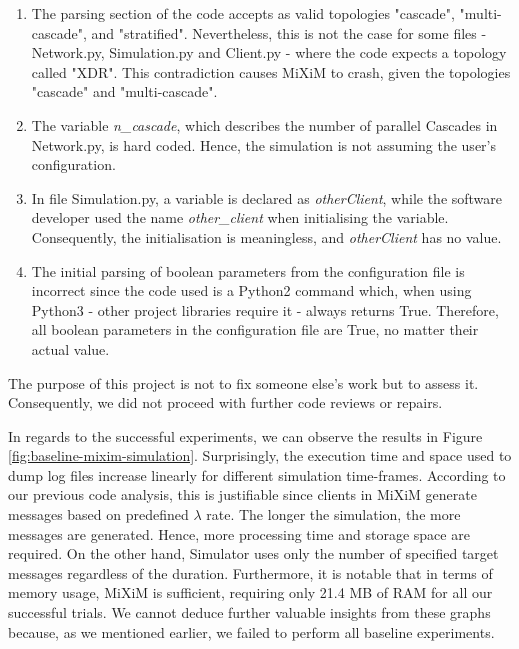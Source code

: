 \documentclass[logo,msc,cyber]{infthesis}   %
\begin{document}
\begin{enumerate}
    \item The parsing section of the code accepts as valid topologies "cascade",
    "multi-cascade", and "stratified". Nevertheless, this is not the case for
    some files - Network.py, Simulation.py and Client.py - where the code
    expects a topology called "XDR". This contradiction causes MiXiM to crash,
    given the topologies "cascade" and "multi-cascade". 
    \item The variable \emph{n\_cascade}, which describes the number of parallel
    Cascades in Network.py, is hard coded. Hence, the simulation is not assuming
    the user's configuration.
    \item In file Simulation.py, a variable is declared as \emph{otherClient}, while
    the software developer used the name \emph{other\_client} when initialising the
    variable. Consequently, the initialisation is meaningless, and \emph{otherClient}
    has no value.
    \item The initial parsing of boolean parameters from the configuration file
    is incorrect since the code used is a Python2 command which, when using
    Python3 - other project libraries require it - always returns True.
    Therefore, all boolean parameters in the configuration file are True, no
    matter their actual value.
\end{enumerate}

The purpose of this project is not to fix someone else's work but to assess
it. Consequently, we did not proceed with further code reviews or repairs.

In regards to the successful experiments, we can observe the results in Figure
\ref{fig:baseline-mixim-simulation}. Surprisingly, the execution time and space
used to dump log files increase linearly for different simulation time-frames.
According to our previous code analysis, this is justifiable since clients in
MiXiM generate messages based on predefined $\lambda$ rate. The longer the
simulation, the more messages are generated. Hence, more processing time and
storage space are required. On the other hand, Simulator uses only the number of
specified target messages regardless of the duration. Furthermore, it is notable
that in terms of memory usage, MiXiM is sufficient, requiring only 21.4 MB of
RAM for all our successful trials. We cannot deduce further valuable insights
from these graphs because, as we mentioned earlier, we failed to perform all
baseline experiments.
\end{document}
